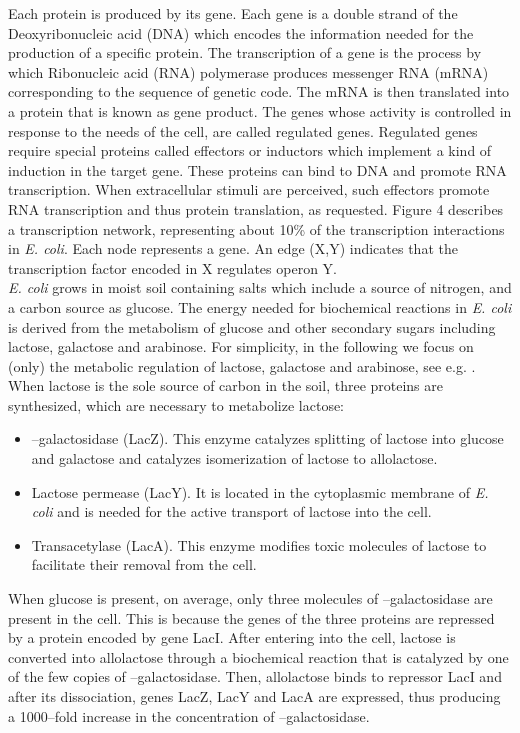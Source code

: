 \documentclass{amsart}
\theoremstyle{definition}
\theoremstyle{remark}
\numberwithin{equation}{section}
\begin{document}
Each protein is produced by its gene. Each gene is a double strand of the Deoxyribonucleic acid (DNA) which encodes the information needed for the production of a specific protein. The transcription of a gene is the process by which  Ribonucleic acid (RNA) polymerase produces messenger RNA (mRNA) corresponding to the sequence of genetic code. The mRNA is then translated into a protein that is known as gene product. 
The genes whose activity is controlled in response to the needs of the cell, are called regulated genes. Regulated genes require special proteins called effectors or inductors which implement a kind of induction in the target gene. These proteins can bind to DNA and promote RNA transcription. 
When extracellular stimuli are perceived, such effectors promote RNA transcription and thus protein translation, as requested. 
Figure 4 describes a transcription network, representing about 10\% of the transcription interactions in \textit{E. coli}. Each node represents a gene. An edge (X,Y) indicates that the transcription factor encoded in X regulates operon Y. \\
\textit{E. coli} grows in moist soil containing salts which include a source of nitrogen, and a carbon source as glucose. 
The energy needed for biochemical reactions in \textit{E. coli} is derived from the metabolism of glucose and other secondary sugars including lactose, galactose and arabinose. For simplicity, in the following we focus on (only) the metabolic regulation of lactose, galactose and arabinose, see e.g. 
\cite{BiocBook1,BiocBook,Alon}. When lactose is the sole source of carbon in the soil, three proteins are synthesized, which are necessary to metabolize lactose: 
\begin{itemize}
\item --galactosidase (LacZ). This enzyme catalyzes splitting of lactose into glucose and galactose and catalyzes isomerization of lactose to allolactose.
\item	Lactose permease (LacY). It is located in the cytoplasmic membrane of \textit{E. coli} and is needed for the active transport of lactose into the cell.
\item Transacetylase (LacA). This enzyme modifies toxic molecules of lactose to facilitate their removal from the cell. 
\end{itemize}
When glucose is present, on average, only three molecules of --galactosidase are present in the cell. This is because the genes of the three proteins are repressed by a protein encoded by gene LacI. After entering into the cell, lactose is converted into allolactose through a biochemical reaction that is catalyzed by one of the few copies of --galactosidase. Then, allolactose binds to repressor LacI and after its dissociation, genes  LacZ, LacY and LacA are expressed, thus producing a 1000--fold increase in the concentration of --galactosidase. 
\end{document}
